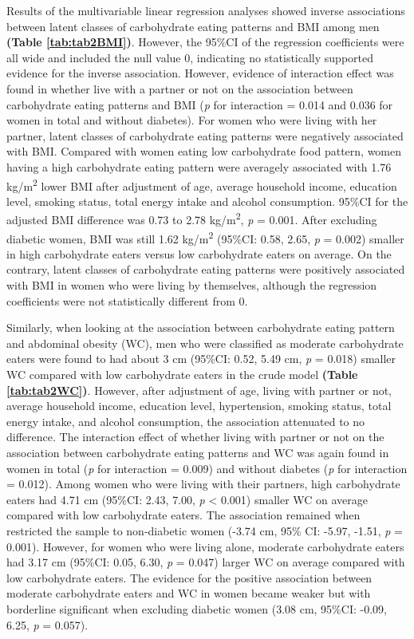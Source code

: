 

Results of the multivariable linear regression analyses showed inverse associations between latent classes of carbohydrate eating patterns and BMI among men \textbf{(Table \ref{tab:tab2BMI})}. However, the 95\%CI of the regression coefficients were all wide and included the null value 0, indicating no statistically supported evidence for the inverse association. However, evidence of interaction effect was found in whether live with a partner or not on the association between carbohydrate eating patterns and BMI (\textit{p} for interaction = 0.014 and 0.036 for women in total and without diabetes). For women who were living with her partner, latent classes of carbohydrate eating patterns were negatively associated with BMI. Compared with women eating low carbohydrate food pattern, women having a high carbohydrate eating pattern were averagely associated with 1.76 kg/m\textsuperscript{2} lower BMI after adjustment of age, average household income, education level, smoking status, total energy intake and alcohol consumption. 95\%CI for the adjusted BMI difference was 0.73 to 2.78 kg/m\textsuperscript{2}, \textit{p} = 0.001. After excluding diabetic women, BMI was still 1.62 kg/m\textsuperscript{2} (95\%CI: 0.58, 2.65, \textit{p} = 0.002) smaller in high carbohydrate eaters versus low carbohydrate eaters on average. On the contrary, latent classes of carbohydrate eating patterns were positively associated with BMI in women who were living by themselves, although the regression coefficients were not statistically different from 0.


Similarly, when looking at the association between carbohydrate eating pattern and abdominal obesity (WC), men who were classified as moderate carbohydrate eaters were found to had about 3 cm (95\%CI: 0.52, 5.49 cm, \textit{p} = 0.018) smaller WC compared with low carbohydrate eaters in the crude model \textbf{(Table \ref{tab:tab2WC})}. However, after adjustment of age, living with partner or not, average household income, education level, hypertension, smoking status, total energy intake, and alcohol consumption, the association attenuated to no difference. The interaction effect of whether living with partner or not on the association between carbohydrate eating patterns and WC was again found in women in total (\textit{p} for interaction = 0.009) and without diabetes (\textit{p} for interaction = 0.012). Among women who were living with their partners, high carbohydrate eaters had 4.71 cm (95\%CI: 2.43, 7.00, \textit{p} < 0.001) smaller WC on average compared with low carbohydrate eaters. The association remained when restricted the sample to non-diabetic women (-3.74 cm, 95\% CI: -5.97, -1.51,  \textit{p} = 0.001). However, for women who were living alone, moderate carbohydrate eaters had 3.17 cm (95\%CI: 0.05, 6.30, \textit{p} = 0.047) larger WC on average compared with low carbohydrate eaters. The evidence for the positive association between moderate carbohydrate eaters and WC in women became weaker but with borderline significant when excluding diabetic women (3.08 cm, 95\%CI: -0.09, 6.25, \textit{p} = 0.057).
   


